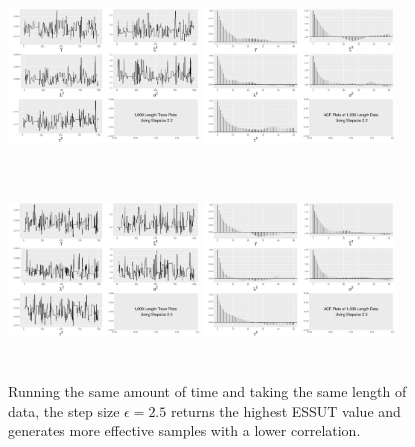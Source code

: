 \begin{figure}[h]\ContinuedFloat
\centering
\includegraphics[width=0.45\textwidth,height=5cm]{Chapters/05MCMCOU/plots/gg1k22chain.pdf}
\includegraphics[width=0.45\textwidth,height=5cm]{Chapters/05MCMCOU/plots/gg1k22acf.pdf}
\includegraphics[width=0.45\textwidth,height=5cm]{Chapters/05MCMCOU/plots/gg1k25chain.pdf}
\includegraphics[width=0.45\textwidth,height=5cm]{Chapters/05MCMCOU/plots/gg1k25acf.pdf}
\caption{Running the same amount of time and taking the same length of data, the step size $\epsilon=2.5$ returns the highest ESSUT value and generates more effective samples with a lower correlation. }\label{1koutof8kfigures}
\end{figure}



